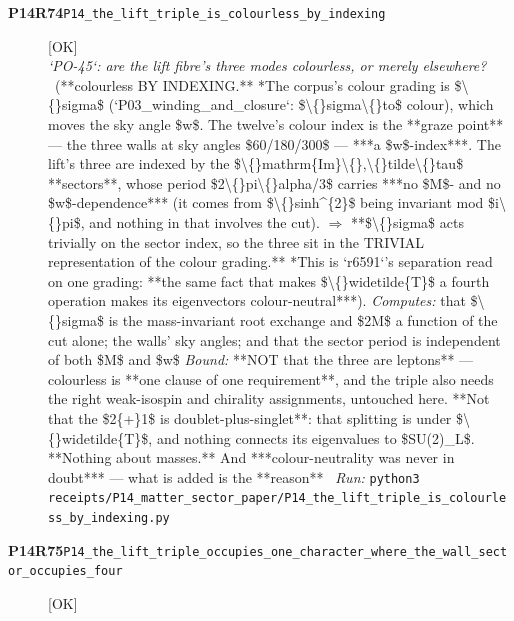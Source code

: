 \begin{description}
\item[\textbf{P14R74}\quad\texttt{P14\_the\_lift\_triple\_is\_colourless\_by\_indexing}]\hfill\textsf{[OK]}\\
\textit{`PO-45`: are the lift fibre's three modes colourless, or merely elsewhere?} \ (**colourless BY INDEXING.** *The corpus's colour grading is \$\textbackslash\{\}sigma\$ (`P03\_winding\_and\_closure`: \$\textbackslash\{\}sigma\textbackslash\{\}to\$ colour), which moves the sky angle \$w\$. The twelve's colour index is the **graze point** --- the three walls at sky angles \$60/180/300\$ --- ***a \$w\$-index***. The lift's three are indexed by the \$\textbackslash\{\}mathrm\{Im\}\textbackslash\{\},\textbackslash\{\}tilde\textbackslash\{\}tau\$ **sectors**, whose period \$2\textbackslash\{\}pi\textbackslash\{\}alpha/3\$ carries ***no \$M\$- and no \$w\$-dependence*** (it comes from \$\textbackslash\{\}sinh\textasciicircum{}\{2\}\$ being invariant mod \$i\textbackslash\{\}pi\$, and nothing in that involves the cut). \ensuremath{\Rightarrow} **\$\textbackslash\{\}sigma\$ acts trivially on the sector index, so the three sit in the TRIVIAL representation of the colour grading.**  *This is `r6591`'s separation read on one grading: **the same fact that makes \$\textbackslash\{\}widetilde\{T\}\$ a fourth operation makes its eigenvectors colour-neutral***). 
\emph{Computes:} that \$\textbackslash\{\}sigma\$ is the mass-invariant root exchange and \$2M\$ a function of the cut alone; the walls' sky angles; and that the sector period is independent of both \$M\$ and \$w\$
 \emph{Bound:}  **NOT that the three are leptons** --- colourless is **one clause of one requirement**, and the triple also needs the right weak-isospin and chirality assignments, untouched here. **Not that the \$2\{+\}1\$ is doublet-plus-singlet**: that splitting is under \$\textbackslash\{\}widetilde\{T\}\$, and nothing connects its eigenvalues to \$SU(2)\_L\$. **Nothing about masses.**  And ***colour-neutrality was never in doubt*** --- what is added is the **reason**
\ \emph{Run:} \texttt{python3 receipts/P14\_matter\_sector\_paper/P14\_the\_lift\_triple\_is\_colourless\_by\_indexing.py}
\item[\textbf{P14R75}\quad\texttt{P14\_the\_lift\_triple\_occupies\_one\_character\_where\_the\_wall\_sector\_occupies\_four}]\hfill\textsf{[OK]}\\

\end{description}
